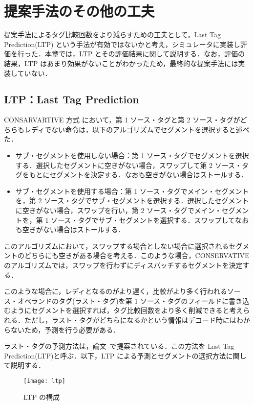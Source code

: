
\chapter{提案手法のその他の工夫}
\label{sec:appendix1}
提案手法によるタグ比較回数をより減らすための工夫として，Last Tag Prediction(LTP) という手法が有効ではないかと考え，シミュレータに実装し評価を行った．本章では，LTP とその評価結果に関して説明する．なお，評価の結果，LTP はあまり効果がないことがわかったため，最終的な提案手法には実装していない．

\section{LTP：Last Tag Prediction}
CONSARVARTIVE 方式 において，第 1 ソース・タグと第 2 ソース・タグがどちらもレディでない命令は，以下のアルゴリズムでセグメントを選択すると述べた．

\begin{itemize}
  \item サブ・セグメントを使用しない場合：第 1 ソース・タグでセグメントを選択する．選択したセグメントに空きがない場合，スワップして第 2 ソース・タグをもとにセグメントを決定する．なおも空きがない場合はストールする．
  \item サブ・セグメントを使用する場合：第 1 ソース・タグでメイン・セグメントを，第 2 ソース・タグでサブ・セグメントを選択する．選択したセグメントに空きがない場合，スワップを行い，第 2 ソース・タグでメイン・セグメントを，第 1 ソース・タグでサブ・セグメントを選択する．スワップしてなおも空きがない場合はストールする．
\end{itemize}

このアルゴリズムにおいて，スワップする場合としない場合に選択されるセグメントのどちらにも空きがある場合を考える．このような場合，CONSERVATIVE のアルゴリズムでは，スワップを行わずにディスパッチするセグメントを決定する．

このような場合に，レディとなるのがより遅く，比較がより多く行われるソース・オペランドのタグ(ラスト・タグ)を第 1 ソース・タグのフィールドに書き込むようにセグメントを選択すれば，タグ比較回数をより多く削減できると考えられる．ただし，ラスト・タグがどちらになるかという情報はデコード時にはわからないため，予測を行う必要がある．

ラスト・タグの予測方法は，論文~\cite{ernst2002}で提案されている．この方法を Last Tag Prediction(LTP)と呼ぶ．以下，LTP による予測とセグメントの選択方法に関して説明する．

\begin{figure}[htb]
  \centering
  \texttt{[image: ltp]}
  \caption{LTP の構成}
  \label{fig:ltp}
\end{figure}

